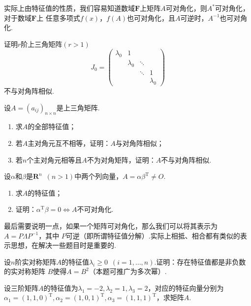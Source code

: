 实际上由特征值的性质，我们容易知道数域$\mathbf{F}$上矩阵$A$可对角化，则$A^*$可对角化，对于数域$\mathbf{F}$上
任意多项式$f(x)$，$f(A)$也可对角化，且$A$可逆时，$A^{-1}$也可对角化.
\begin{example}
    证明$r$阶上三角矩阵$(r>1)$
    \[J_0=\begin{pmatrix}
        \lambda_0 & 1 &  &  \\
          & \lambda_0 & \ddots &  \\
          &  & \ddots &  1 \\
          &  &  &  \lambda_0
    \end{pmatrix}\]
    不与对角阵相似.
\end{example}
\begin{example}
    设$A=(a_{ij})_{n\times n}$是上三角矩阵.
    \begin{enumerate}
        \item 求$A$的全部特征值；

        \item 若$A$主对角元互不相等，证明：$A$与对角阵相似；

        \item 若$n$个主对角元相等且$A$不为对角矩阵，证明：$A$不与对角阵相似.
    \end{enumerate}
\end{example}
\begin{example}
    设$\alpha$和$\beta$是$\mathbf{R}^n\enspace (n>1)$中两个列向量，$A=\alpha\beta^\mathrm{T}\neq O$.
    \begin{enumerate}
        \item 求$A$的特征值；

        \item 证明：$\alpha^\mathrm{T}\beta=0\iff A$不可对角化.
    \end{enumerate}
\end{example}
最后需要说明一点，如果一个矩阵可对角化，那么我们可以将其表示为$A=P\Lambda P^{-1}$，其中
$P$可逆（即所谓特征值分解）.实际上相抵、相合都有类似的表示思想，在解决一些题目时是重要的.
\begin{example}
    设$n$阶实对称矩阵$A$的特征值$\lambda_i\geqslant 0\enspace(i=1,\ldots,n)$.证明：存在特征值都是非负数的实对称矩阵
    $B$使得$A=B^2$（本题可推广为多次幂）.
\end{example}
\begin{example}
    设三阶矩阵$A$的特征值为$\lambda_1=-2,\lambda_2=1,\lambda_3=2$，对应的特征向量分别为
    $\alpha_1=(1,1,0)^\mathrm{T},\alpha_2=(1,0,1)^\mathrm{T},\alpha_3=(1,1,1)^\mathrm{T}$，求矩阵$A$.
\end{example}
